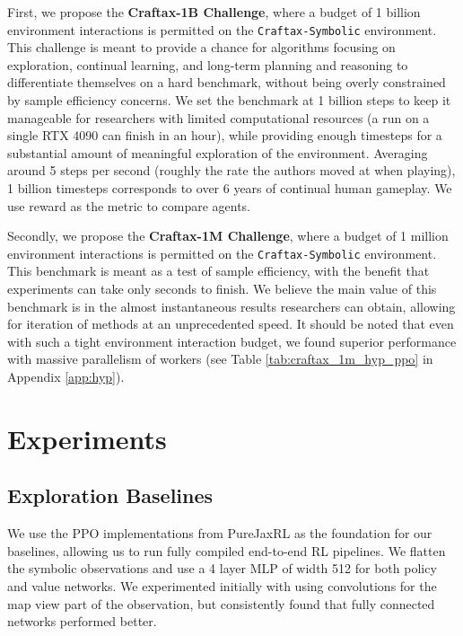\documentclass{article}
\theoremstyle{plain}
\theoremstyle{definition}
\theoremstyle{remark}
\begin{document}
First, we propose the \textbf{Craftax-1B Challenge}, where a budget of 1 billion environment interactions is permitted on the \texttt{Craftax-Symbolic} environment.  This challenge is meant to provide a chance for algorithms focusing on exploration, continual learning, and long-term planning and reasoning to differentiate themselves on a hard benchmark, without being overly constrained by sample efficiency concerns.  We set the benchmark at 1 billion steps to keep it manageable for researchers with limited computational resources (a run on a single RTX 4090 can finish in an hour), while providing enough timesteps for a substantial amount of meaningful exploration of the environment.  Averaging around 5 steps per second (roughly the rate the authors moved at when playing), 1 billion timesteps corresponds to over 6 years of continual human gameplay.  We use reward as the metric to compare agents.

Secondly, we propose the \textbf{Craftax-1M Challenge}, where a budget of 1 million environment interactions is permitted on the \texttt{Craftax-Symbolic} environment.  This benchmark is meant as a test of sample efficiency, with the benefit that experiments can take only seconds to finish.  We believe the main value of this benchmark is in the almost instantaneous results researchers can obtain, allowing for iteration of methods at an unprecedented speed.  It should be noted that even with such a tight environment interaction budget, we found superior performance with massive parallelism of workers (see Table \ref{tab:craftax_1m_hyp_ppo} in Appendix \ref{app:hyp}).

\section{Experiments}

\subsection{Exploration Baselines}

We use the PPO implementations from PureJaxRL \citep{lu2022discovered} as the foundation for our baselines, allowing us to run fully compiled end-to-end RL pipelines.  We flatten the symbolic observations and use a 4 layer MLP of width 512 for both policy and value networks.  We experimented initially with using convolutions for the map view part of the observation, but consistently found that fully connected networks performed better.
\end{document}
